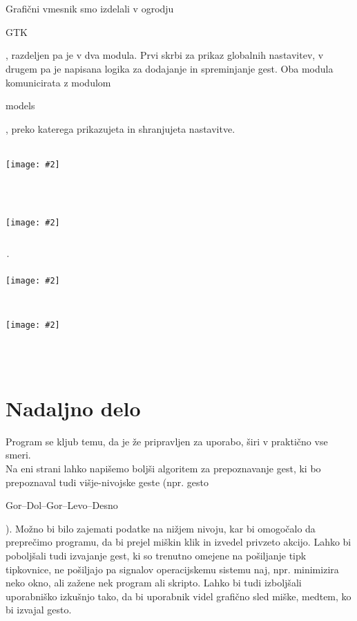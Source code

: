\documentclass[10pt,a4paper,oneside]{book}
\newcommand\inline[1]{%
\begin{Sbox}{#1}\end{Sbox}%
\colorbox{lightgray}{\TheSbox}%
}
\newcommand\pic[2]{%
\parbox{1cm}{%
\begin{center}%
\texttt{[image: \#2]}%
\end{center}%
}%
}
\newcommand\br{%
 \ \\ \ \\%
}
\begin{document}
\br
Grafični vmesnik smo izdelali v ogrodju \inline{GTK}, razdeljen pa je v dva modula. Prvi skrbi za prikaz globalnih nastavitev, v drugem pa je napisana logika za dodajanje in spreminjanje gest. Oba modula komunicirata z modulom \inline{models}, preko katerega prikazujeta in shranjujeta nastavitve.
\br
\pic{0.5}{./logoPython.png}\ \ \ \ \ \ \ \ \ \ \ \ \ \ \ \ \ \ \ \ \ \ \ \ \ \ \ \ \ \ \ \ \ \ \ \ \ \ \ \ \ \ \ \ \ \ \ \ \ \ \ \ \ \ \ \ \ \ \ \ \ \ \ \ \ \ \ \ \ \ \ \ \ \ \ \ \ \ \ \ \ \ \ \ \ \ \ \ \ 
\pic{0.2}{./logoGTK.jpg}\\[1cm]
\. \ \ \ \ \ \ \ \ \ \ \ \ \ \ \ \ \ \ \ \ \ \ \ \pic{0.25}{./logoX.png}\ \ \ \ \ \ \ \ \ \ \ \ \ \ \ \ \ \ \ \ \ \ \ \ \ \ \ \ \ \ \ \ \ \ \ \ \ \ \ \ \ \ \ \ \ \ \ \ \ \ \ \ 
\pic{0.15}{./logoAppindicator.png}
\br



\chapter{Nadaljno delo}
Program se kljub temu, da je že pripravljen za uporabo, širi v praktično vse smeri.\\
Na eni strani lahko napišemo boljši algoritem za prepoznavanje gest, ki bo prepoznaval tudi višje-nivojske geste (npr. gesto \inline{Gor--Dol--Gor--Levo--Desno}). Možno bi bilo zajemati podatke na nižjem nivoju, kar bi omogočalo da preprečimo programu, da bi prejel miškin klik in izvedel privzeto akcijo. Lahko bi poboljšali tudi izvajanje gest, ki so trenutno omejene na pošiljanje tipk tipkovnice, ne pošiljajo pa signalov operacijskemu sistemu naj, npr. minimizira neko okno, ali zažene nek program ali skripto. Lahko bi tudi izboljšali uporabniško izkušnjo tako, da bi uporabnik videl grafično sled miške, medtem, ko bi izvajal gesto.
\end{document}
